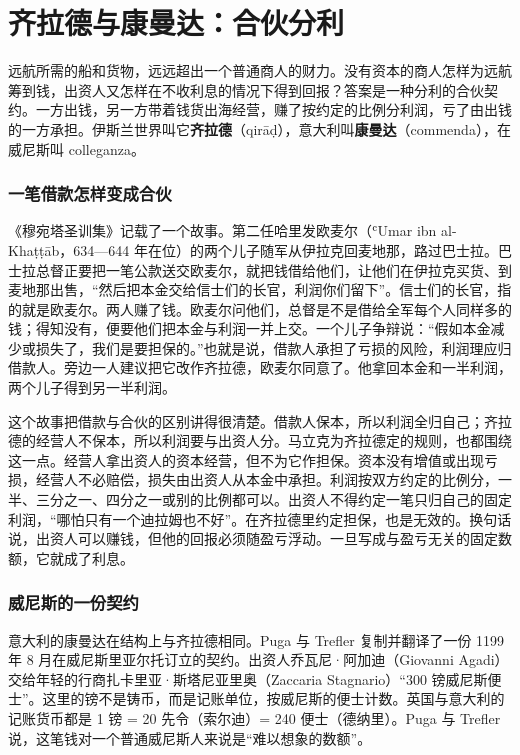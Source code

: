 \section{齐拉德与康曼达：合伙分利}\label{sec:islamic-partnership}

远航所需的船和货物，远远超出一个普通商人的财力。没有资本的商人怎样为远航筹到钱，出资人又怎样在不收利息的情况下得到回报？答案是一种分利的合伙契约。一方出钱，另一方带着钱货出海经营，赚了按约定的比例分利润，亏了由出钱的一方承担。伊斯兰世界叫它\textbf{齐拉德}（qirāḍ），意大利叫\textbf{康曼达}（commenda），在威尼斯叫 colleganza。

\subsubsection{一笔借款怎样变成合伙}
《穆宛塔圣训集》记载了一个故事。第二任哈里发欧麦尔（ʿUmar ibn al-Khaṭṭāb，634—644 年在位）的两个儿子随军从伊拉克回麦地那，路过巴士拉。巴士拉总督正要把一笔公款送交欧麦尔，就把钱借给他们，让他们在伊拉克买货、到麦地那出售，“然后把本金交给信士们的长官，利润你们留下”。信士们的长官，指的就是欧麦尔。两人赚了钱。欧麦尔问他们，总督是不是借给全军每个人同样多的钱；得知没有，便要他们把本金与利润一并上交。一个儿子争辩说：“假如本金减少或损失了，我们是要担保的。”\cite{muwatta}也就是说，借款人承担了亏损的风险，利润理应归借款人。旁边一人建议把它改作齐拉德，欧麦尔同意了。他拿回本金和一半利润，两个儿子得到另一半利润\cite{muwatta}。

这个故事把借款与合伙的区别讲得很清楚。借款人保本，所以利润全归自己；齐拉德的经营人不保本，所以利润要与出资人分。马立克为齐拉德定的规则，也都围绕这一点。经营人拿出资人的资本经营，但不为它作担保。资本没有增值或出现亏损，经营人不必赔偿，损失由出资人从本金中承担。利润按双方约定的比例分，一半、三分之一、四分之一或别的比例都可以。出资人不得约定一笔只归自己的固定利润，“哪怕只有一个迪拉姆也不好”。在齐拉德里约定担保，也是无效的\cite{muwatta}。换句话说，出资人可以赚钱，但他的回报必须随盈亏浮动。一旦写成与盈亏无关的固定数额，它就成了利息。

\subsubsection{威尼斯的一份契约}
意大利的康曼达在结构上与齐拉德相同。Puga 与 Trefler 复制并翻译了一份 1199 年 8 月在威尼斯里亚尔托订立的契约\cite{puga2014}。出资人乔瓦尼·阿加迪（Giovanni Agadi）交给年轻的行商扎卡里亚·斯塔尼亚里奥（Zaccaria Stagnario）“300 镑威尼斯便士”。这里的镑不是铸币，而是记账单位，按威尼斯的便士计数。英国与意大利的记账货币都是 1 镑 = 20 先令（索尔迪）= 240 便士（德纳里）。Puga 与 Trefler 说，这笔钱对一个普通威尼斯人来说是“难以想象的数额”。


